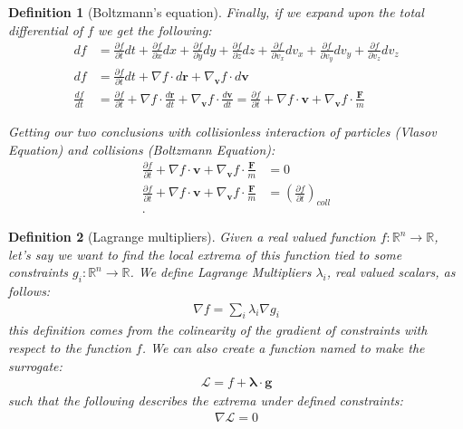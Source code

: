 \documentclass[12pt]{article}
\newtheorem{definition}{Definition}
\begin{document}
\begin{definition}[Boltzmann's equation]
Finally, if we expand upon the total differential of $f$ we get the following:
\begin{align*}
    df &= \frac{\partial f}{\partial t} dt + \frac{\partial f}{\partial x} dx + \frac{\partial f}{\partial y} dy + \frac{\partial f}{\partial z} dz + \frac{\partial f}{\partial v_x} dv_x + \frac{\partial f}{\partial v_y} dv_y + \frac{\partial f}{\partial v_z} dv_z \\
    df &= \frac{\partial f}{\partial t} dt + \nabla f \cdot d\mathbf{r} + \nabla_{\mathbf{v}} f \cdot d\mathbf{v} \\
    \frac{df}{dt} &= \frac{\partial f}{\partial t} + \nabla f \cdot \frac{d\mathbf{r}}{dt} + \nabla_{\mathbf{v}} f \cdot \frac{d\mathbf{v}}{dt} = \frac{\partial f}{\partial t} + \nabla f \cdot \mathbf{v}+ \nabla_{\mathbf{v}} f \cdot \frac{\mathbf{F}}{m}
\end{align*}

Getting our two conclusions with collisionless interaction of particles (Vlasov Equation) and collisions (Boltzmann Equation):
\begin{align*}
    \frac{\partial f}{\partial t} + \nabla f \cdot \mathbf{v}+ \nabla_{\mathbf{v}} f \cdot \frac{\mathbf{F}}{m} &= 0 \\
    \frac{\partial f}{\partial t} + \nabla f \cdot \mathbf{v}+ \nabla_{\mathbf{v}} f \cdot \frac{\mathbf{F}}{m} &= \left( \frac{\partial f}{\partial t} \right)_{coll} \\
.\end{align*}

\end{definition}

\begin{definition}[Lagrange multipliers]
    Given a real valued function $f: \mathbb{R}^n \to \mathbb{R}$, let's say we want to find the local extrema of this function tied to some constraints $g_i: \mathbb{R}^n \to \mathbb{R}$. We define Lagrange Multipliers $\lambda_i$, real valued scalars, as follows:
    \begin{align*}
        \nabla f = \sum_{ i } \lambda_i \nabla g_i
    \end{align*}
    this definition comes from the colinearity of the gradient of constraints with respect to the function $f$. We can also create a function named  to make the surrogate:
    \begin{align*}
        \mathcal{L} = f + \mathbf{\lambda} \cdot \mathbf{g}
    \end{align*}
    such that the following describes the extrema under defined constraints:
    \begin{align*}
        \nabla \mathcal{L} = 0
    \end{align*}
\end{definition}




\end{document}
